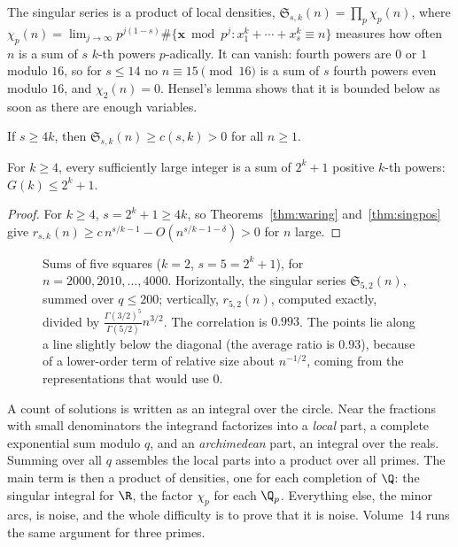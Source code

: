 The singular series is a product of local densities, $\mathfrak S_{s,k}(n)=\prod_p\chi_p(n)$, where $\chi_p(n)=\lim_{j\to\infty}p^{j(1-s)}\#\{\mathbf x\bmod p^j:x_1^k+\cdots+x_s^k\equiv n\}$ measures how often $n$ is a sum of $s$ $k$-th powers $p$-adically. It can vanish: fourth powers are $0$ or $1$ modulo $16$, so for $s\le14$ no $n\equiv15\pmod{16}$ is a sum of $s$ fourth powers even modulo $16$, and $\chi_2(n)=0$. Hensel's lemma shows that it is bounded below as soon as there are enough variables.

\begin{theorem}\label{thm:singpos}
If $s\ge4k$, then $\mathfrak S_{s,k}(n)\ge c(s,k)>0$ for all $n\ge1$.
\end{theorem}

\begin{corollary}[Hua, 1938]\label{cor:gk}
For $k\ge4$, every sufficiently large integer is a sum of $2^k+1$ positive $k$-th powers: $G(k)\le2^k+1$.
\end{corollary}
\begin{proof}
For $k\ge4$, $s=2^k+1\ge4k$, so Theorems~\ref{thm:waring} and~\ref{thm:singpos} give $r_{s,k}(n)\ge c\,n^{s/k-1}-O(n^{s/k-1-\delta})>0$ for $n$ large.
\end{proof}

\begin{figure}[ht]
\centering
{}
\caption{Sums of five squares ($k=2$, $s=5=2^k+1$), for $n=2000,2010,\dots,4000$. Horizontally, the singular series $\mathfrak S_{5,2}(n)$, summed over $q\le200$; vertically, $r_{5,2}(n)$, computed exactly, divided by $\frac{\Gamma(3/2)^5}{\Gamma(5/2)}n^{3/2}$. The correlation is $0.993$. The points lie along a line slightly below the diagonal (the average ratio is $0.93$), because of a lower-order term of relative size about $n^{-1/2}$, coming from the representations that would use $0$.}
\label{fig:fivesquares}
\end{figure}

\begin{beauty}
A count of solutions is written as an integral over the circle. Near the fractions with small denominators the integrand factorizes into a \emph{local} part, a complete exponential sum modulo $q$, and an \emph{archimedean} part, an integral over the reals. Summing over all $q$ assembles the local parts into a product over all primes. The main term is then a product of densities, one for each completion of $\Q$: the singular integral for $\R$, the factor $\chi_p$ for each $\Q_p$. Everything else, the minor arcs, is noise, and the whole difficulty is to prove that it is noise. Volume~14 runs the same argument for three primes.
\end{beauty}

